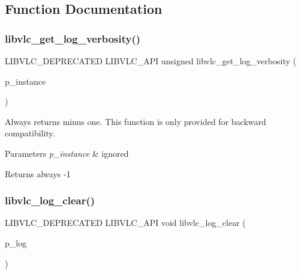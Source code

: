 \subsection{Function Documentation}
\mbox{\label{group__libvlc__log_gac15ede92b2992223f9f6f43b07fe3903}} 
\subsubsection{\texorpdfstring{libvlc\+\_\+get\+\_\+log\+\_\+verbosity()}{libvlc\_get\_log\_verbosity()}}
{\footnotesize\ttfamily L\+I\+B\+V\+L\+C\+\_\+\+D\+E\+P\+R\+E\+C\+A\+T\+ED L\+I\+B\+V\+L\+C\+\_\+\+A\+PI unsigned libvlc\+\_\+get\+\_\+log\+\_\+verbosity (\begin{DoxyParamCaption}\item[{const \hyperlink{group__libvlc__core_ga316d739a80da4678206c79f4d6c2e284}{libvlc\+\_\+instance\+\_\+t} $\ast$}]{p\+\_\+instance }\end{DoxyParamCaption})}

Always returns minus one. This function is only provided for backward compatibility.


\begin{DoxyParams}{Parameters}
{\em p\+\_\+instance} & ignored \\
\hline
\end{DoxyParams}
\begin{DoxyReturn}{Returns}
always -\/1 
\end{DoxyReturn}
\mbox{\label{group__libvlc__log_ga64aa12f17bc9e6ed9c3525cf55573697}} 
\subsubsection{\texorpdfstring{libvlc\+\_\+log\+\_\+clear()}{libvlc\_log\_clear()}}
{\footnotesize\ttfamily L\+I\+B\+V\+L\+C\+\_\+\+D\+E\+P\+R\+E\+C\+A\+T\+ED L\+I\+B\+V\+L\+C\+\_\+\+A\+PI void libvlc\+\_\+log\+\_\+clear (\begin{DoxyParamCaption}\item[{\hyperlink{structvlc__log__t}{libvlc\+\_\+log\+\_\+t} $\ast$}]{p\+\_\+log }\end{DoxyParamCaption})}

